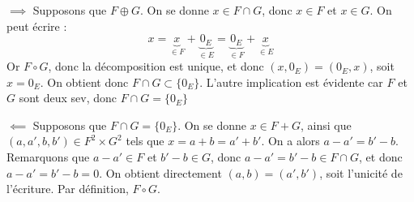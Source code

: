 \documentclass[a4paper,french,bookmarks]{article}
\begin{document}
\begin{enumerate}
\begin{nproof}
        \begin{enumerate}
            \itt $\boxed{\implies}$ Supposons que $F \oplus G$. On se donne $x \in F \cap G$, donc $x \in F$ et $x \in G$. On peut écrire :
            \[ x = \underbrace{x}_{\in F} + \underbrace{0_E}_{\in E} = \underbrace{0_E}_{\in F} + \underbrace{x}_{\in E}\]
            Or $F \circ G$, donc la décomposition est unique, et donc $(x, 0_E) = (0_E, x)$, soit $x = 0_E$. On obtient donc $F \cap G \subset \{ 0_E \}$. L'autre implication est évidente car $F$ et $G$ sont deux sev, donc $F \cap G = \{ 0_E \}$
            
            \itt $\boxed{\impliedby}$ Supposons que $F \cap G = \{ 0_E\}$. On se donne $x \in F + G$, ainsi que $(a, a', b, b') \in F^2 \times G^2$ tels que $x = a + b = a' + b'$.
            On a alors $a - a' = b' - b$. Remarquons que $a - a' \in F$ et $b' - b \in G$, donc $a - a' = b' - b \in F \cap G$, et donc $a - a' = b' - b = 0$. On obtient directement $(a, b) = (a', b')$, soit l'unicité de l'écriture. Par définition, $F \circ G$.
            
        \end{enumerate}
        
    \end{nproof}
    \yesbefore
\end{enumerate}
\end{document}
